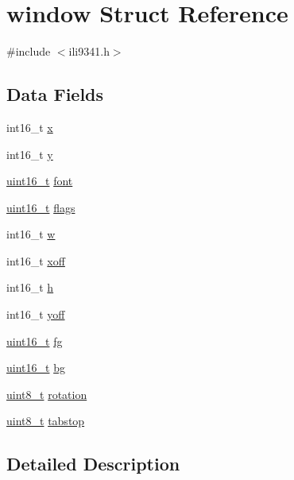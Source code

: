 \hypertarget{structwindow}{\section{window Struct Reference}
\label{structwindow}
}


{\ttfamily \#include $<$ili9341.\-h$>$}

\subsection*{Data Fields}
\begin{DoxyCompactItemize}
\item 
int16\-\_\-t \hyperlink{structwindow_a879b99940dfc34772f0257f54c67b817}{x}
\item 
int16\-\_\-t \hyperlink{structwindow_a95c7023fc42e79ab42c291b90a490776}{y}
\item 
\hyperlink{send_8c_a273cf69d639a59973b6019625df33e30}{uint16\-\_\-t} \hyperlink{structwindow_acee24e56db43557a46cbb5ca3fe35021}{font}
\item 
\hyperlink{send_8c_a273cf69d639a59973b6019625df33e30}{uint16\-\_\-t} \hyperlink{structwindow_ad58fae853f87093ef4f0139df0a3f33d}{flags}
\item 
int16\-\_\-t \hyperlink{structwindow_ad89fdeb11ce94e2e7501f7290372d6ae}{w}
\item 
int16\-\_\-t \hyperlink{structwindow_a12d0408f393bc8d23cc3f1ce46c39879}{xoff}
\item 
int16\-\_\-t \hyperlink{structwindow_a822391abd5d09e6ce7152f68cff3ef2b}{h}
\item 
int16\-\_\-t \hyperlink{structwindow_a95c482caa25e4a283d962643d410bc29}{yoff}
\item 
\hyperlink{send_8c_a273cf69d639a59973b6019625df33e30}{uint16\-\_\-t} \hyperlink{structwindow_ac8739cdb3c50efcc1deaa5ab955a5e62}{fg}
\item 
\hyperlink{send_8c_a273cf69d639a59973b6019625df33e30}{uint16\-\_\-t} \hyperlink{structwindow_affcf5d29153103c2537542f5a4f8ba87}{bg}
\item 
\hyperlink{send_8c_aba7bc1797add20fe3efdf37ced1182c5}{uint8\-\_\-t} \hyperlink{structwindow_afbd48ebcb41e68d0f458dac593578aa8}{rotation}
\item 
\hyperlink{send_8c_aba7bc1797add20fe3efdf37ced1182c5}{uint8\-\_\-t} \hyperlink{structwindow_a88d2836d45dd428d8fadfd703f0f965f}{tabstop}
\end{DoxyCompactItemize}


\subsection{Detailed Description}


